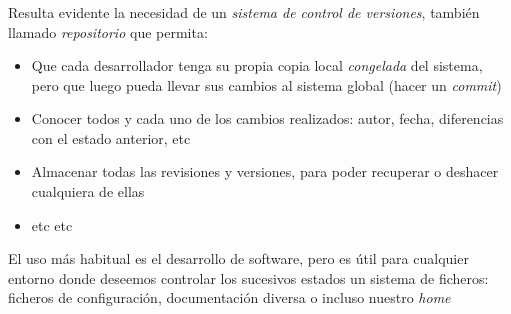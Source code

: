 \documentclass[ucs]{beamer}
\begin{document}
\begin{frame}[fragile]
\frametitle{}
Resulta evidente la necesidad de un \emph{sistema de control de versiones}, también llamado \emph{repositorio} que permita:
\begin{itemize}
\item
Que cada desarrollador tenga su propia copia local \emph{congelada} del sistema, pero que luego pueda llevar
sus cambios al sistema global (hacer un \emph{commit})
\item
Conocer todos y cada uno de los cambios realizados: autor, fecha, diferencias con el estado anterior, etc
\item
Almacenar todas las revisiones y versiones, para poder recuperar o deshacer cualquiera de ellas
\item
etc etc
\end{itemize}
El uso más habitual es el desarrollo de software, pero es útil para cualquier entorno
donde deseemos controlar los sucesivos estados un sistema de ficheros: ficheros de configuración, documentación
diversa
o incluso nuestro \emph{home}

\end{frame}
\end{document}
